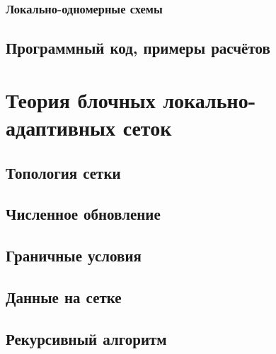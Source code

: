 \documentclass[a4paper, 14pt]{article}
\begin{document}
            \subsubsection{Локально-одномерные схемы}
            
        \subsection{Программный код, примеры расчётов}\label{sec:StaticCode}
        
    
    \section{Теория блочных локально-адаптивных сеток}\label{sec:LAG}
    
        
        \subsection{Топология сетки}
        

        \subsection{Численное обновление}
        

        \subsection{Граничные условия}
        

        \subsection{Данные на сетке}
        

        \subsection{Рекурсивный алгоритм}
        
\end{document}
